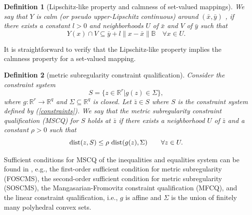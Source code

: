 \documentclass[11pt]{article}
\numberwithin{equation}{section}
\newtheorem{definition}{Definition}[section]
\begin{document}
{\begin{definition}[Lipschitz-like property and calmness of set-valued mappings]
We say that $Y$ is calm (or pseudo upper-Lipschitz continuous) around $(\bar x,\bar y)$ \cite[Definition 2.8]{YeYe1997}, if
there exists a constant $l>0$ and neighborhoods $U$ of $\bar x$ and $V$ of  $\bar y$ such that
$$Y(x) \cap V \subseteq \bar y+l\|x-\bar x\|\mathbb{B} \quad \forall x\in U.$$
\end{definition}

It is straightforward to verify that the Lipschitz-like property implies the calmness property for a set-valued mapping.

\begin{definition}[metric subregularity constraint qualification]
Consider the constraint system
\begin{equation}\label{constraints} S=\{z \in \mathbb{R}^r|g(z)\in \Sigma\},
\end{equation}
where $g:\mathbb{R}^r \rightarrow \mathbb{R}^{q}$ and  $\Sigma \subseteq \mathbb{R}^q$  is closed. Let $\bar z\in S$ where $S$ is the constraint system defined by (\ref{constraints}). We say that the metric subregularity constraint qualification (MSCQ)  for  $S$ holds at  $\bar z$ if there exists a neighborhood $U$ of $\bar z$ and a constant $\rho>0$ such that
$${\rm dist}(z,S) \leq \rho\ {\rm dist}(g(z),\Sigma) \qquad \forall z\in U.$$
\end{definition}
Sufficient conditions for MSCQ of the inequalities and equalities system can be found in \cite[Theorem 7.4]{YeZhou18}, e.g., the first-order sufficient condition for metric subregularity (FOSCMS), the second-order sufficient condition for metric subregularity (SOSCMS), the Mangasarian-Fromovitz constraint qualification (MFCQ), and the linear constraint qualification, i.e., $g$ is affine and $\Sigma$ is the union of finitely many polyhedral convex sets.

}
\end{document}
